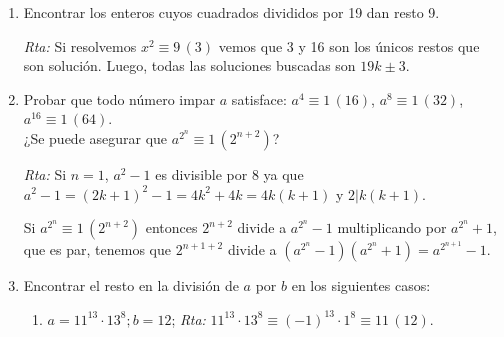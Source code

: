 \documentclass[12pt,spanish,makeidx]{amsbook}
\newcommand{\rta}{\noindent\textit{Rta: }}
\newcommand{\md}[1]{{\,}\left(#1\right)}
\begin{document}
\begin{enumerate}
\begin{enumerate}
		\rta Si $t$ es inversible módulo $m$ sea $h$ tal que $th\equiv 1 \md{m}$. Esto es $th-1=mq$, y por lo tanto $1=th-mq$, lo cual dice que $(t,m)=1$. Recíprocamente si $(t, m)=1$ existen enteros $h$ y $q$ tales que $1=th+mq$ y esto nos dice que $m$ divide a $1-th$ o sea $th\equiv 1 \md{m}$.
		
		\item Determinar los inversibles módulo $m$, para $m=11,12,16$.
			
		\rta $\{1,2,3,\dots, 9,10\}, \{1, 5, 7,11\} , \{1, 3, 5, 7, 9 ,11, 13, 15\}$.
		
	\end{enumerate}
	
	
	
	
	\smallskip
	\item Encontrar los enteros cuyos cuadrados divididos por 19 dan resto 9.
		
	\rta Si resolvemos $x^2\equiv 9 \md{3} $ vemos que 3 y 16 son los únicos restos que son solución. Luego, todas las soluciones buscadas son $19k\pm3$. 
	
	
	\smallskip
	
	\item Probar que todo número impar $a$ satisface: $a^4 \equiv 1\md{16}$, $a^8 \equiv 1\md{32}$, $a^{16}\equiv 1\md{64}$.\\ ¿Se puede asegurar que $a^{2^n} \equiv 1 \md{2^{n+2}}$?
		
	\rta Si $n=1$,  $a^2-1$ es divisible por 8 ya que $a^2-1 =(2k+1)^2-1=4k^2+4k=4k(k+1)$ y $2\vert k(k+1)$.
	
	Si $a^{2^n}\equiv 1 \md{2^{n+2}}$ entonces $2^{n+2}$ divide a $a^{2^n}-1$ multiplicando por $a^{2^n}+ 1$, que es par, tenemos que $2^{n+1+2}$ divide a $(a^{2^n}-1)(a^{2^n}+1)=a^{2^{n+1}}-1$.
	
	
	\smallskip
	
\item Encontrar el resto en la división de $a$ por $b$ en los siguientes casos:
\begin{enumerate}
	\item $a = 11^{13}\cdot13^8 ; b = 12$;  \rta  $11^{13}\cdot13^8\equiv (-1)^{13}\cdot 1^8\equiv 11 \md{12}$.
	

\end{enumerate}
\end{enumerate}
\end{document}
